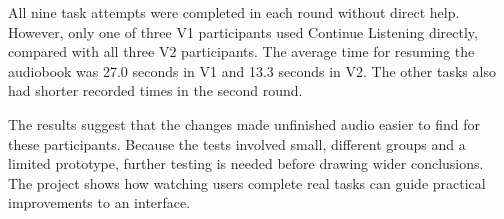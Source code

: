 \documentclass[a4paper,12pt,oneside]{report}
\begin{document}
All nine task attempts were completed in each round without direct help. However, only one of three V1 participants used Continue Listening directly, compared with all three V2 participants. The average time for resuming the audiobook was 27.0 seconds in V1 and 13.3 seconds in V2. The other tasks also had shorter recorded times in the second round.

The results suggest that the changes made unfinished audio easier to find for these participants. Because the tests involved small, different groups and a limited prototype, further testing is needed before drawing wider conclusions. The project shows how watching users complete real tasks can guide practical improvements to an interface.

\begingroup
\setlength{\parskip}{0pt}
\tableofcontents
\endgroup
\clearpage
{}








\clearpage
{}
{}



\appendix



\end{document}
